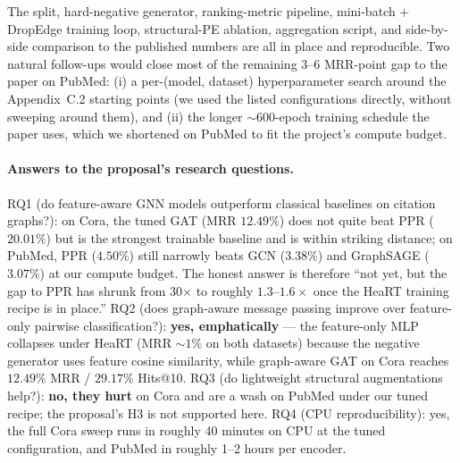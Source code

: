 \documentclass[10pt,a4paper]{article}
\begin{document}
The split, hard-negative generator, ranking-metric pipeline, mini-batch
+ DropEdge training loop, structural-PE ablation, aggregation script,
and side-by-side comparison to the published numbers are all in place
and reproducible. Two natural follow-ups would close most of the
remaining $3$--$6$ MRR-point gap to the paper on PubMed: (i) a
per-(model, dataset) hyperparameter search around the
Appendix~C.2 starting points (we used the listed configurations
directly, without sweeping around them), and (ii) the longer
$\sim 600$-epoch training schedule the paper uses, which we shortened
on PubMed to fit the project's compute budget.

\paragraph{Answers to the proposal's research questions.}
RQ1 (do feature-aware GNN models outperform classical baselines on
citation graphs?): on Cora, the tuned GAT (MRR $12.49\%$) does not
quite beat PPR ($20.01\%$) but is the strongest trainable baseline and
is within striking distance; on PubMed, PPR ($4.50\%$) still narrowly
beats GCN ($3.38\%$) and GraphSAGE ($3.07\%$) at our compute budget.
The honest answer is therefore ``not yet, but the gap to PPR has
shrunk from 30$\times$ to roughly $1.3$--$1.6\times$ once the HeaRT
training recipe is in place.'' RQ2 (does graph-aware message passing
improve over feature-only pairwise classification?): \textbf{yes,
emphatically} --- the feature-only MLP collapses under HeaRT
(MRR $\sim 1\%$ on both datasets) because the negative generator uses
feature cosine similarity, while graph-aware GAT on Cora reaches
$12.49\%$ MRR / $29.17\%$ Hits@10. RQ3 (do lightweight structural
augmentations help?): \textbf{no, they hurt} on Cora and are a wash on
PubMed under our tuned recipe; the proposal's H3 is not supported here.
RQ4 (CPU reproducibility): yes, the full Cora sweep runs in roughly
40 minutes on CPU at the tuned configuration, and PubMed in roughly
1--2 hours per encoder.
\end{document}
